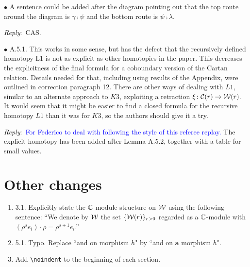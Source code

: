 \documentclass{amsart}
\newcommand{\ar}{\medskip\noindent\textit{Reply}:\ }
\def\subitem{\medskip\noindent$\bullet$ }
\begin{document}
\begin{enumerate}
	\subitem A sentence could be added after the diagram pointing out that the top route
	around the diagram is $\gamma \comp \psi$ and the bottom route is $\psi \comp \lambda$.

	\ar CAS.

	\subitem A.5.1. This works in some sense, but has the defect that the recursively defined homotopy
	L1 is not as explicit as other homotopies in the paper.
	This decreases the explicitness of the final formula for a coboundary version of the Cartan relation.
	Details needed for that, including using results of the Appendix, were outlined in correction paragraph 12.
	There are other ways of dealing with $L1$, similar to an alternate approach to $K3$, exploiting a
	retraction $\xi \colon \mathcal{C}(r) \to \mathcal{W}(r)$.
	It would seem that it might be easier to find a closed formula for the recursive homotopy $L1$ than it was for $K3$, so the authors should give it a try.

	\ar \textcolor{blue}{For Federico to deal with following the style of this referee replay.} The explicit homotopy has been added after Lemma A.5.2, together with a table for small values.
\end{enumerate}

\section{Other changes}

\begin{enumerate}
	\item 3.1. Explicitly state the $\mathbb{C}$-module structure on $\mathcal{W}$ using the following sentence:
	``We denote by $\mathcal{W}$ the set $\{\mathcal{W}(r)\}_{r > 0}$ regarded as a $\mathbb{C}$-module with $(\rho^s e_i) \cdot \rho = \rho^{s+1} e_i$.''

	\item 5.1. Typo. Replace ``and on morphism $h$" by ``and on \textbf{a} morphism $h$".

	\item Add \verb|\noindent| to the beginning of each section.
\end{enumerate}
\end{document}
